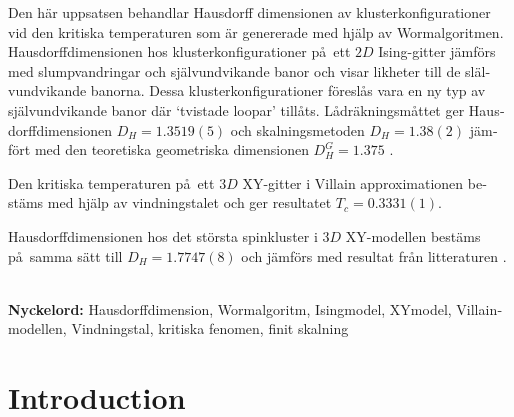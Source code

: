 \documentclass[nocoverpage,swedish,g5paper]{thesis}
\begin{document}
\begin{otherlanguage}{swedish}
\begin{foreginabstract}
Den h\"ar uppsatsen behandlar Hausdorff dimensionen av klusterkonfigurationer vid den kritiska temperaturen som \"ar genererade med hj\"alp av Wormalgoritmen. Hausdorffdimensionen hos klusterkonfigurationer p\aa \ ett $2D$ Ising-gitter j\"amf\"ors med slumpvandringar och sj\"alvundvikande banor och visar likheter till de sl\"alvundvikande banorna. Dessa klusterkonfigurationer f\"oresl\aa s vara en ny typ av sj\"alvundvikande banor d\"ar `tvistade loopar' till\aa ts. L\aa dr\"akningsm\aa ttet \cite{strogatz:dynamics_chaos} ger Hausdorffdimensionen $D_H = 1.3519(5)$ och skalningsmetoden \cite{Hove:hausdorff_crit_fluctuations} $D_H = 1.38(2)$ j\"amf\"ort med den teoretiska geometriska dimensionen $D_H^{G} = 1.375$ \cite{Duplantier:GeoHausdorff}.

Den kritiska temperaturen p\aa \  ett $3D$ XY-gitter i Villain approximationen best\"ams med hj\"alp av vindningstalet och ger resultatet $T_c = 0.3331(1)$.

Hausdorffdimensionen hos det st\"orsta spinkluster i $3D$ XY-modellen best\"ams p\aa\  samma s\"att till $D_H = 1.7747(8)$ och j\"amf\"ors med resultat fr\aa n litteraturen \cite{Prokofev:comment_on_hove_hausdorff_crit_fluct} \cite{Hove:hausdorff_crit_fluctuations}.
\\ \noindent \strut \\
\textbf{Nyckelord:} Hausdorffdimension, Wormalgoritm, Isingmodel, XYmodel, Villainmodellen, Vindningstal, kritiska fenomen, finit skalning
\end{foreginabstract}
\end{otherlanguage}

\begin{preface}

\end{preface}

\tableofcontents

\mainmatter


\chapter{Introduction}

\end{document}
